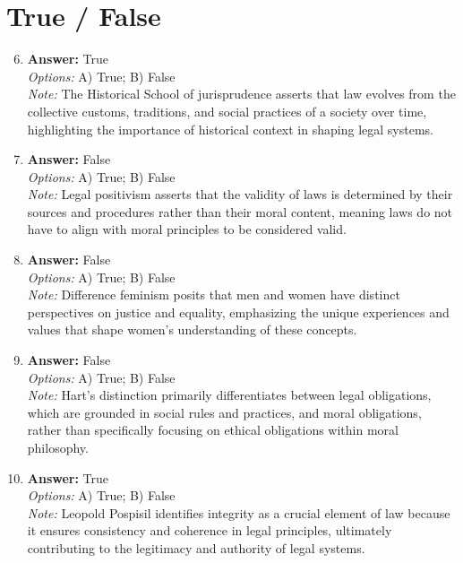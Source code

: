 \documentclass[12pt]{article}
\begin{document}
\section*{True / False}
\begin{enumerate}[label=\arabic*.]
\setcounter{enumi}{5}
\item \textbf{Answer:} True
\\ \textit{Options:} A) True; B) False
\\ \textit{Note:} The Historical School of jurisprudence asserts that law evolves from the collective customs, traditions, and social practices of a society over time, highlighting the importance of historical context in shaping legal systems.
\item \textbf{Answer:} False
\\ \textit{Options:} A) True; B) False
\\ \textit{Note:} Legal positivism asserts that the validity of laws is determined by their sources and procedures rather than their moral content, meaning laws do not have to align with moral principles to be considered valid.
\item \textbf{Answer:} False
\\ \textit{Options:} A) True; B) False
\\ \textit{Note:} Difference feminism posits that men and women have distinct perspectives on justice and equality, emphasizing the unique experiences and values that shape women's understanding of these concepts.
\item \textbf{Answer:} False
\\ \textit{Options:} A) True; B) False
\\ \textit{Note:} Hart's distinction primarily differentiates between legal obligations, which are grounded in social rules and practices, and moral obligations, rather than specifically focusing on ethical obligations within moral philosophy.
\item \textbf{Answer:} True
\\ \textit{Options:} A) True; B) False
\\ \textit{Note:} Leopold Pospisil identifies integrity as a crucial element of law because it ensures consistency and coherence in legal principles, ultimately contributing to the legitimacy and authority of legal systems.
\end{enumerate}
\end{document}
